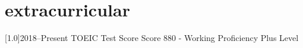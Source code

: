 \documentclass[portuguese]{cv-style}     %
\begin{document}
\section{extracurricular}
 \vspace{-0.2cm}
\begin{entrylist}
\entry
{\scalebox{.8}[1.0]{2018--Present}}
{TOEIC Test Score}
{}
{Score 880 - Working Proficiency Plus Level}
\end{entrylist}
\vspace{-0.2cm}
\end{document}

